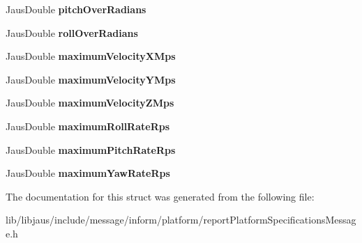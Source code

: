 \begin{DoxyCompactItemize}
\item 
\hypertarget{struct_report_platform_specifications_message_struct_af4e71013f6efff383e7b01bc9f6362d2}{\-Jaus\-Double {\bfseries pitch\-Over\-Radians}}\label{struct_report_platform_specifications_message_struct_af4e71013f6efff383e7b01bc9f6362d2}

\item 
\hypertarget{struct_report_platform_specifications_message_struct_a60fa42b6a6d7b9e1b38d7d152054843a}{\-Jaus\-Double {\bfseries roll\-Over\-Radians}}\label{struct_report_platform_specifications_message_struct_a60fa42b6a6d7b9e1b38d7d152054843a}

\item 
\hypertarget{struct_report_platform_specifications_message_struct_a04b23969664964945a24a573765a6404}{\-Jaus\-Double {\bfseries maximum\-Velocity\-X\-Mps}}\label{struct_report_platform_specifications_message_struct_a04b23969664964945a24a573765a6404}

\item 
\hypertarget{struct_report_platform_specifications_message_struct_af79080cd449ca94de8077fc4b06b34ae}{\-Jaus\-Double {\bfseries maximum\-Velocity\-Y\-Mps}}\label{struct_report_platform_specifications_message_struct_af79080cd449ca94de8077fc4b06b34ae}

\item 
\hypertarget{struct_report_platform_specifications_message_struct_a0dec1879db4be7fe4f5e71d2c163efd5}{\-Jaus\-Double {\bfseries maximum\-Velocity\-Z\-Mps}}\label{struct_report_platform_specifications_message_struct_a0dec1879db4be7fe4f5e71d2c163efd5}

\item 
\hypertarget{struct_report_platform_specifications_message_struct_aea8d9a9cc14e4914d4d187bc88d0d763}{\-Jaus\-Double {\bfseries maximum\-Roll\-Rate\-Rps}}\label{struct_report_platform_specifications_message_struct_aea8d9a9cc14e4914d4d187bc88d0d763}

\item 
\hypertarget{struct_report_platform_specifications_message_struct_adc837b934603447fd74d44c319b5a9dc}{\-Jaus\-Double {\bfseries maximum\-Pitch\-Rate\-Rps}}\label{struct_report_platform_specifications_message_struct_adc837b934603447fd74d44c319b5a9dc}

\item 
\hypertarget{struct_report_platform_specifications_message_struct_a0de765ae3dc270d9316b0acbc011b5a1}{\-Jaus\-Double {\bfseries maximum\-Yaw\-Rate\-Rps}}\label{struct_report_platform_specifications_message_struct_a0de765ae3dc270d9316b0acbc011b5a1}

\end{DoxyCompactItemize}


\-The documentation for this struct was generated from the following file\-:\begin{DoxyCompactItemize}
\item 
lib/libjaus/include/message/inform/platform/report\-Platform\-Specifications\-Message.\-h\end{DoxyCompactItemize}
